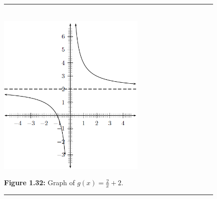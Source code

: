     \setcounter{subfigure}{0}


	\begin{figure}[H] %
    \begin{center}
    \rule[.1in]{\figurerulewidth}{.005in} \\
        \label{m39341*uid162!!!underscore!!!media}\label{m39341*uid162!!!underscore!!!printimage}\includegraphics[height=300px]{col11306.imgs/m39341_MG10C11_026.png} %
        
      \vspace{2pt}
    \vspace{\rubberspace}\par \begin{cnxcaption}
	  \small \textbf{Figure 1.32: }Graph of \begin{math}g\left(x\right)=\frac{2}{x}+2\end{math}.
	\end{cnxcaption}
      
    \vspace{.1in}
    \rule[.1in]{\figurerulewidth}{.005in} \\
        
    \end{center}

 \end{figure}   

    \addtocounter{footnote}{-0}
    
\par
            \label{m39341*eid75993}\vspace{.5cm} 
      
